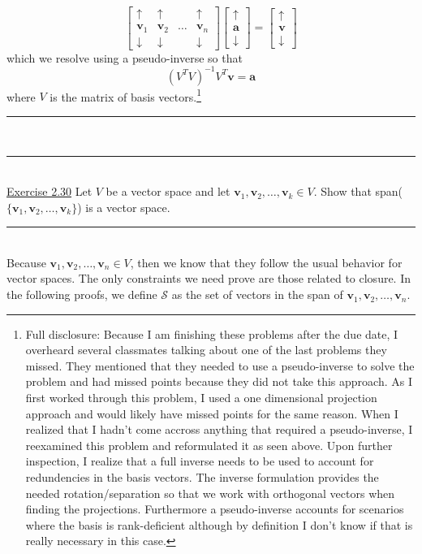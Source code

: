 \documentclass{article}
\newcommand{\problemsep}{\leavevmode\\[0.05in] \rule[\baselineskip/4]{\textwidth}{1pt} \\[0.005in] \rule[\baselineskip]{\textwidth}{1pt}\vspace{-\baselineskip}\leavevmode\\[0.05in]}
\newcommand{\statementsep}{\leavevmode\\[0.005in] \rule[\baselineskip/4]{\textwidth}{0.4pt}\leavevmode\\[0.005in]}
\begin{document}
\begin{equation*}
	\begin{bmatrix} \uparrow & \uparrow & & \uparrow \\
               \mathbf{v}_1& \mathbf{v}_2 & \hdots & \mathbf{v}_n \\
                 \downarrow& \downarrow & & \downarrow\end{bmatrix}\begin{bmatrix} \uparrow \\ \mathbf{a} \\ \downarrow \end{bmatrix} = \begin{bmatrix} \uparrow \\ \mathbf{v} \\ \downarrow \end{bmatrix}
\end{equation*}
which we resolve using a pseudo-inverse so that
\begin{equation*}
	(V^TV)^{-1}V^T\mathbf{v} = \mathbf{a} 
\end{equation*}
where $V$ is the matrix of basis vectors.\footnote{Full disclosure: Because I am finishing these problems after the due date, I overheard several classmates talking about one of the last problems they missed. They mentioned that they needed to use a pseudo-inverse to solve the problem and had missed points because they did not take this approach. As I first worked through this problem, I used a one dimensional projection approach and would likely have missed points for the same reason.  When I realized that I hadn't come accross anything that required a pseudo-inverse, I reexamined this problem and reformulated it as seen above. Upon further inspection, I realize that a full inverse needs to be used to account for redundencies in the basis vectors. The inverse formulation provides the needed rotation/separation so that we work with orthogonal vectors when finding the projections. Furthermore a pseudo-inverse accounts for scenarios where the basis is rank-deficient although by definition I don't know if that is really necessary in this case.}
\problemsep
\noindent\underline{Exercise 2.30}
Let $V$ be a vector space and let $\mathbf{v}_1,\mathbf{v}_2,\hdots,\mathbf{v}_k \in V$. Show that span($\{\mathbf{v}_1,\mathbf{v}_2,\hdots,\mathbf{v}_k\}$) is a vector space.
\statementsep
Because $\mathbf{v}_1,\mathbf{v}_2,\hdots,\mathbf{v}_n \in V$, then we know that they follow the usual behavior for vector spaces. The only constraints we need prove are those related to closure. In the following proofs, we define $\mathcal{S}$ as the set of vectors in the span of $\mathbf{v}_1,\mathbf{v}_2,\hdots,\mathbf{v}_n$. \\[0.05in]
\end{document}
